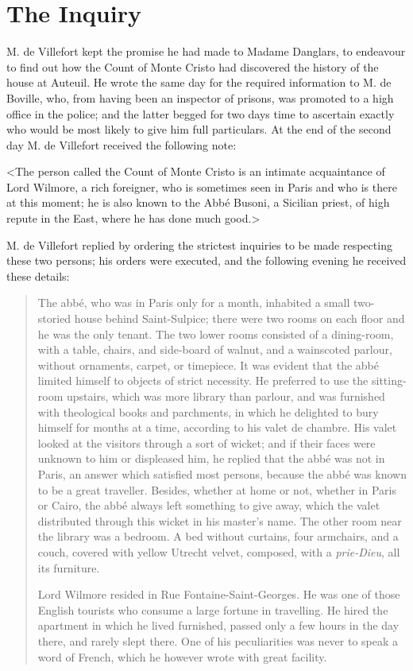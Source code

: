 \chapter{The Inquiry} 
	
	\lettrine{M}{.} de Villefort kept the promise he had made to Madame Danglars, to endeavour to find out how the Count of Monte Cristo had discovered the history of the house at Auteuil. He wrote the same day for the required information to M. de Boville, who, from having been an inspector of prisons, was promoted to a high office in the police; and the latter begged for two days time to ascertain exactly who would be most likely to give him full particulars. At the end of the second day M. de Villefort received the following note: 

 <The person called the Count of Monte Cristo is an intimate acquaintance of Lord Wilmore, a rich foreigner, who is sometimes seen in Paris and who is there at this moment; he is also known to the Abbé Busoni, a Sicilian priest, of high repute in the East, where he has done much good.> 

 M. de Villefort replied by ordering the strictest inquiries to be made respecting these two persons; his orders were executed, and the following evening he received these details: 

\begin{quotation}
The abbé, who was in Paris only for a month, inhabited a small two-storied house behind Saint-Sulpice; there were two rooms on each floor and he was the only tenant. The two lower rooms consisted of a dining-room, with a table, chairs, and side-board of walnut, and a wainscoted parlour, without ornaments, carpet, or timepiece. It was evident that the abbé limited himself to objects of strict necessity. He preferred to use the sitting-room upstairs, which was more library than parlour, and was furnished with theological books and parchments, in which he delighted to bury himself for months at a time, according to his valet de chambre. His valet looked at the visitors through a sort of wicket; and if their faces were unknown to him or displeased him, he replied that the abbé was not in Paris, an answer which satisfied most persons, because the abbé was known to be a great traveller. Besides, whether at home or not, whether in Paris or Cairo, the abbé always left something to give away, which the valet distributed through this wicket in his master's name. The other room near the library was a bedroom. A bed without curtains, four armchairs, and a couch, covered with yellow Utrecht velvet, composed, with a \textit{prie-Dieu}, all its furniture. 

 Lord Wilmore resided in Rue Fontaine-Saint-Georges. He was one of those English tourists who consume a large fortune in travelling. He hired the apartment in which he lived furnished, passed only a few hours in the day there, and rarely slept there. One of his peculiarities was never to speak a word of French, which he however wrote with great facility.
 \end{quotation}

